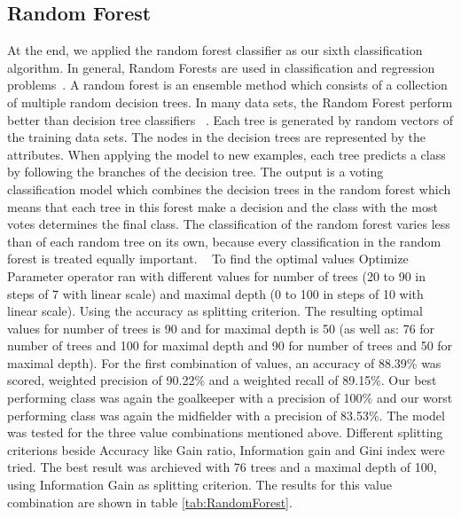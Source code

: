 \subsection{Random Forest}

At the end, we applied the random forest classifier as our sixth classification algorithm. In
general, Random Forests are used in classification and regression problems~\cite{ref_rapidminerRandomForest}.
A random forest is an ensemble method which consists of a collection of
multiple random decision trees. In many data sets, the Random Forest perform better than
decision tree classifiers ~\cite{ref_Tan}. Each tree is generated by random vectors of the training data sets. The nodes in the decision
trees are represented by the attributes. \newline 
When applying the model to new examples, each tree predicts a class by following the branches of the decision tree. The output is a voting
classification model which combines the decision trees in the random forest which means that
each tree in this forest make a decision and the class with the most votes determines the final
class. The classification of the random forest varies less than of each random tree on its own,
because every classification in the random forest is treated equally important. ~\cite{ref_rapidminerRandomForest} \newline
To find the optimal
values Optimize Parameter operator ran with different
values for number of trees (20 to 90 in steps of 7 with linear scale) and maximal depth (0 to
100 in steps of 10 with linear scale). Using the accuracy as splitting criterion. The resulting
optimal values for number of trees is 90 and for maximal depth is 50 (as well as: 76 for
number of trees and 100 for maximal depth and 90 for number of trees and 50 for maximal
depth). For the first combination of values, an accuracy of 88.39\% was scored, weighted precision of
90.22\% and a weighted recall of 89.15\%. Our best performing class was again the goalkeeper with a
precision of 100\% and our worst performing class was again the midfielder with a precision
of 83.53\%. The model was tested for the three
value combinations mentioned above. Different splitting criterions beside
Accuracy like Gain ratio, Information gain and Gini index were tried. The best result was archieved with
76 trees and a maximal depth of 100, using Information Gain as splitting criterion. The
results for this value combination are shown in table \ref{tab:RandomForest}.

